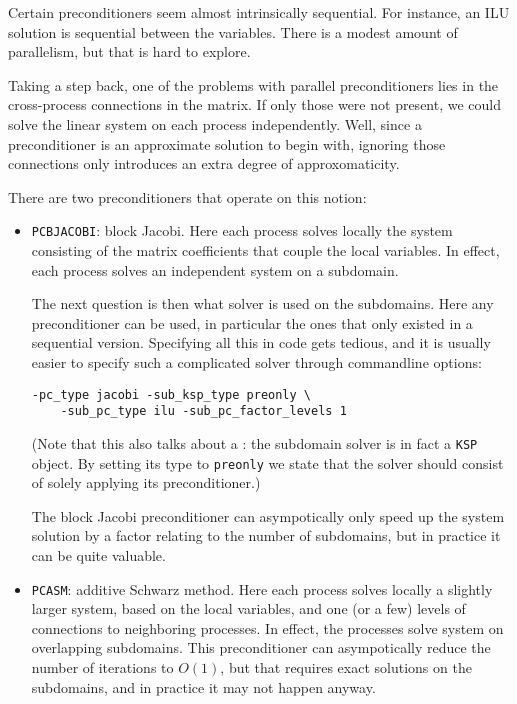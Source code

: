 Certain preconditioners seem almost intrinsically sequential.
For instance, an ILU solution is sequential between the variables.
There is a modest amount of parallelism, but that is hard to explore.

Taking a step back, one of the problems with parallel preconditioners
lies in the cross-process connections in the matrix. If only those were not present,
we could solve the linear system on each process independently.
Well, since a preconditioner is an approximate solution to begin with,
ignoring those connections only introduces an extra degree of approxomaticity.

There are two preconditioners that operate on this notion:
\begin{itemize}
\item \lstinline{PCBJACOBI}: block Jacobi. Here each process solves locally the system
  consisting of the matrix coefficients that couple the local variables.
  In effect, each process solves an independent system on a subdomain.

  The next question is then what solver is used on the subdomains.
  Here any preconditioner can be used, in particular the ones that only
  existed in a sequential version. Specifying all this in code gets tedious,
  and it is usually easier to specify such a complicated solver through
  commandline options:
\begin{verbatim}
-pc_type jacobi -sub_ksp_type preonly \
    -sub_pc_type ilu -sub_pc_factor_levels 1 
\end{verbatim}
(Note that this also talks about a : the subdomain solver is in fact
a \lstinline{KSP} object. By setting its type to \lstinline{preonly} we state that the
solver should consist of solely applying its preconditioner.)

  The block Jacobi preconditioner can asympotically only speed up the
  system solution by a factor relating to the number of subdomains,
  but in practice it can be quite valuable.
\item \lstinline{PCASM}: additive Schwarz method. Here each process
  solves locally a slightly larger system, based on the local
  variables, and one (or a few) levels of connections to neighboring processes.
  In effect, the processes solve system on overlapping subdomains.
  This preconditioner can asympotically reduce the number of iterations to $O(1)$,
  but that requires exact solutions on the subdomains, and in practice it may
  not happen anyway.
\end{itemize}

